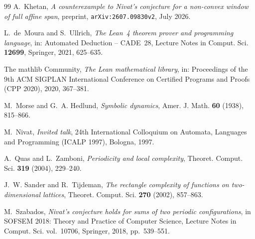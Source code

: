 \documentclass[11pt,reqno]{amsart}
\theoremstyle{plain}
\theoremstyle{definition}
\theoremstyle{remark}
\theoremstyle{plain}
\theoremstyle{remark}
\theoremstyle{definition}
\numberwithin{equation}{section}
\begin{document}
\begin{thebibliography}{99}
A.~Khetan,
\emph{A counterexample to Nivat's conjecture for a non-convex window of full
affine span},
preprint, \texttt{arXiv:2607.09830v2}, July 2026.

L.~de~Moura and S.~Ullrich,
\emph{The Lean~4 theorem prover and programming language},
in: Automated Deduction -- CADE~28, Lecture Notes in Comput. Sci.
\textbf{12699}, Springer, 2021, 625--635.

The mathlib Community,
\emph{The Lean mathematical library},
in: Proceedings of the 9th ACM SIGPLAN International Conference on Certified
Programs and Proofs (CPP 2020), 2020, 367--381.

M.~Morse and G.~A. Hedlund,
\emph{Symbolic dynamics},
Amer. J. Math. \textbf{60} (1938), 815--866.

M.~Nivat,
\emph{Invited talk},
24th International Colloquium on Automata, Languages and Programming
(ICALP 1997), Bologna, 1997.

A.~Quas and L.~Zamboni,
\emph{Periodicity and local complexity},
Theoret. Comput. Sci. \textbf{319} (2004), 229--240.

J.~W. Sander and R.~Tijdeman,
\emph{The rectangle complexity of functions on two-dimensional lattices},
Theoret. Comput. Sci. \textbf{270} (2002), 857--863.

M.~Szabados,
\emph{Nivat's conjecture holds for sums of two periodic configurations},
in SOFSEM 2018: Theory and Practice of Computer Science,
Lecture Notes in Comput. Sci. vol.~10706, Springer, 2018, pp.~539--551.

\end{thebibliography}
\end{document}
